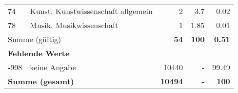 \begin{longtable}{lXrrr}
     74 &
     \multicolumn{1}{X}{ Kunst, Kunstwissenschaft allgemein   } &


       \num{2} &
       \num[round-mode=places,round-precision=2]{3,7} &
         \num[round-mode=places,round-precision=2]{0,02} \\

     78 &
     \multicolumn{1}{X}{ Musik, Musikwissenschaft   } &


       \num{1} &
       \num[round-mode=places,round-precision=2]{1,85} &
         \num[round-mode=places,round-precision=2]{0,01} \\
     \midrule
     \multicolumn{2}{l}{Summe (gültig)} &
       \textbf{\num{54}} &
     \textbf{100} &
       \textbf{\num[round-mode=places,round-precision=2]{0,51}} \\
     \multicolumn{5}{l}{\textbf{Fehlende Werte}}\\
       -998 &
       keine Angabe &
         \num{10440} &
        - &
         \num[round-mode=places,round-precision=2]{99,49} \\
     \midrule
     \multicolumn{2}{l}{\textbf{Summe (gesamt)}} &
          \textbf{\num{10494}} &
        \textbf{-} &
        \textbf{100} \\
     \bottomrule
     \end{longtable}
     
